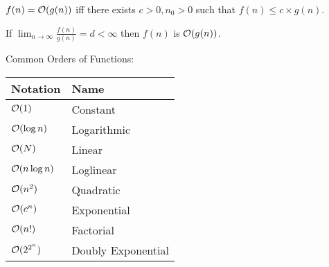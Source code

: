 \begin{defn}[Big O]
$f(n)=\mathcal{O}(g(n))$ iff there exists $c>0, n_0 >0$ such that $f(n)\leq c\times g(n)$.
\end{defn}

\begin{defn}
If $\lim_{n\to\infty}\frac{f(n)}{g(n)}=d<\infty$ then $f(n)$ is $\mathcal{O}(g(n))$.
\end{defn}
Common Orders of Functions:\\
\begin{center}
\begin{tabular}{l | l}
	Notation & Name \\
	\hline
	$\mathcal{O}(1)$ & Constant \\
	$\mathcal{O}(\log{n})$ & Logarithmic \\
	$\mathcal{O}(N)$ & Linear \\
	$\mathcal{O}(n \log{n})$ & Loglinear \\
	$\mathcal{O}(n^2)$ & Quadratic \\
	$\mathcal{O}(c^n)$ & Exponential \\
	$\mathcal{O}(n!)$ & Factorial \\
	$\mathcal{O}(2^{2^{n}})$ & Doubly Exponential	
\end{tabular}
\end{center}